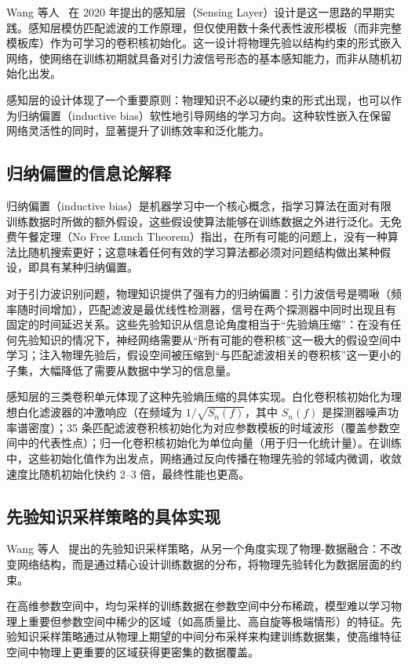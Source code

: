 Wang 等人~\cite{wang2020deeplearning} 在 2020 年提出的感知层（Sensing Layer）设计是这一思路的早期实践。感知层模仿匹配滤波的工作原理，但仅使用数十条代表性波形模板（而非完整模板库）作为可学习的卷积核初始化。这一设计将物理先验以结构约束的形式嵌入网络，使网络在训练初期就具备对引力波信号形态的基本感知能力，而非从随机初始化出发。

感知层的设计体现了一个重要原则：物理知识不必以硬约束的形式出现，也可以作为归纳偏置（inductive bias）软性地引导网络的学习方向。这种软性嵌入在保留网络灵活性的同时，显著提升了训练效率和泛化能力。

\subsection{归纳偏置的信息论解释}

归纳偏置（inductive bias）是机器学习中一个核心概念，指学习算法在面对有限训练数据时所做的额外假设，这些假设使算法能够在训练数据之外进行泛化。无免费午餐定理（No Free Lunch Theorem）指出，在所有可能的问题上，没有一种算法比随机搜索更好；这意味着任何有效的学习算法都必须对问题结构做出某种假设，即具有某种归纳偏置。

对于引力波识别问题，物理知识提供了强有力的归纳偏置：引力波信号是啁啾（频率随时间增加），匹配滤波是最优线性检测器，信号在两个探测器中同时出现且有固定的时间延迟关系。这些先验知识从信息论角度相当于“先验熵压缩”：在没有任何先验知识的情况下，神经网络需要从“所有可能的卷积核”这一极大的假设空间中学习；注入物理先验后，假设空间被压缩到“与匹配滤波相关的卷积核”这一更小的子集，大幅降低了需要从数据中学习的信息量。

感知层的三类卷积单元体现了这种先验熵压缩的具体实现。白化卷积核初始化为理想白化滤波器的冲激响应（在频域为 $1/\sqrt{S_n(f)}$，其中 $S_n(f)$ 是探测器噪声功率谱密度）；35 条匹配滤波卷积核初始化为对应参数模板的时域波形（覆盖参数空间中的代表性点）；归一化卷积核初始化为单位向量（用于归一化统计量）。在训练中，这些初始化值作为出发点，网络通过反向传播在物理先验的邻域内微调，收敛速度比随机初始化快约 2--3 倍，最终性能也更高。

\subsection{先验知识采样策略的具体实现}

Wang 等人~\cite{wang2022normflow} 提出的先验知识采样策略，从另一个角度实现了物理-数据融合：不改变网络结构，而是通过精心设计训练数据的分布，将物理先验转化为数据层面的约束。

在高维参数空间中，均匀采样的训练数据在参数空间中分布稀疏，模型难以学习物理上重要但参数空间中稀少的区域（如高质量比、高自旋等极端情形）的特征。先验知识采样策略通过从物理上期望的中间分布采样来构建训练数据集，使高维特征空间中物理上更重要的区域获得更密集的数据覆盖。

